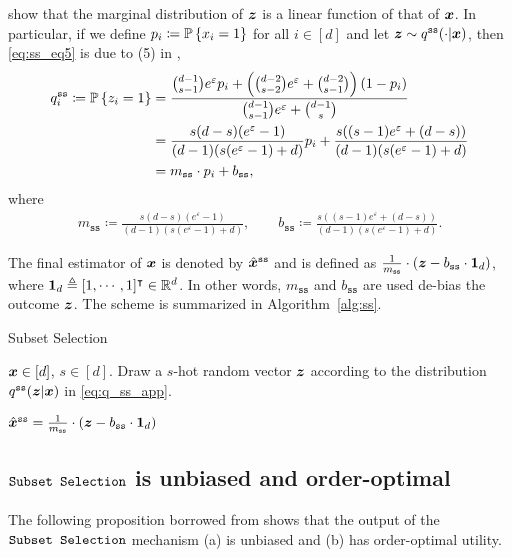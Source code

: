 \cite{YB18} show that the marginal distribution of ${\boldsymbol{z}}$ is a linear function of that of ${\boldsymbol{x}}$. In particular, if we define $p_i \coloneqq \mathbb{P}\left\{ x_i = 1 \right\}$ for all $i \in [d]$ and let ${\boldsymbol{z}} \sim q^{\texttt{ss}}(\cdot |{\boldsymbol{x}})$, then \eqref{eq:ss_eq5} is due to (5) in \cite{YB18},
\begin{align}
    q^{\texttt{ss}}_i \coloneqq \mathbb{P}\left\{ z_i = 1 \right\}
    & = \frac{\binom{d-1}{s-1} e^\varepsilon p_i + \left( \binom{d-2}{s-2}e^\varepsilon + \binom{d-2}{s-1} \right) (1-p_i)}{\binom{d-1}{s-1} e^\varepsilon + \binom{d-1}{s}} \label{eq:ss_eq5}\\
    & = \frac{s(d  -  s)(e^{\varepsilon}-1)}{(d  -  1)(s(e^{\varepsilon}  -  1)+d)} p_i+  \frac{s((s  -  1)e^{\varepsilon} +(d  -  s))}{(d  -  1)(s(e^{\varepsilon}  -  1)+d)} \\
    & = m_{\texttt{ss}} \cdot p_i + b_{\texttt{ss}}, \label{eq:ss_marginal}
\end{align}
where 
\begin{align}
    m_{\texttt{ss}} \coloneqq \frac{s(d  -  s)(e^{\varepsilon}-1)}{(d  -  1)(s(e^{\varepsilon}  -  1)+d)}, \qquad  b_{\texttt{ss}} \coloneqq  \frac{s((s  -  1)e^{\varepsilon} +(d  -  s))}{(d  -  1)(s(e^{\varepsilon}  -  1)+d)}. \label{eq:scaling_factors_ss}
\end{align} 

The final estimator of ${\boldsymbol{x}}$ is denoted by $\hat{{\boldsymbol{x}}}^{\texttt{ss}}$ and is defined as $\frac{1}{m_{\texttt{ss}}} \cdot ({\boldsymbol{z}}-b_{\texttt{ss}}\cdot\mathbf{1}_d)$, where 
$\mathbf{1}_d \triangleq [1,\cdots,1]^\intercal \in \mathbb{R}^d$. In other words, $m_{\texttt{ss}}$ and $b_{\texttt{ss}}$ are used de-bias the outcome ${\boldsymbol{z}}$. The scheme is summarized in Algorithm~\ref{alg:ss}.
\begin{algorithm}
\caption{Subset Selection}
\label{alg:ss}
\begin{algorithmic}
\Require ${\boldsymbol{x}} \in [d]$, $s \in [d]$.
\State Draw a $s$-hot random vector ${\boldsymbol{z}}$ according to the distribution $q^{\texttt{ss}}({\boldsymbol{z}}|{\boldsymbol{x}})$ in \eqref{eq:q_ss_app}.

\Return $\hat{{\boldsymbol{x}}}^{\texttt{ss}} = \frac{1}{m_{\texttt{ss}}} \cdot ({\boldsymbol{z}}-b_{\texttt{ss}}\cdot\mathbf{1}_d)$
\end{algorithmic}
\end{algorithm}

\subsection{\texorpdfstring{$\texttt{Subset Selection}$}{Subset Selection} is unbiased and order-optimal}
The following proposition borrowed from \cite{YB18} shows that the output of the $\texttt{Subset Selection}$ mechanism  (a) is unbiased and (b) has order-optimal utility.

